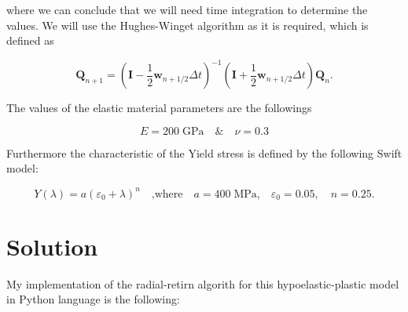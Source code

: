 \documentclass[12pt,a4paper]{article}
\begin{document}
where we can conclude that we will need time integration to determine the values. We will use the Hughes-Winget algorithm as it is required, which is defined as 

\begin{equation}
    \boldsymbol{Q}_{n+1} = \left(\boldsymbol{I} - \frac{1}{2} \boldsymbol{w}_{n+1/2} \Delta t \right)^{-1} 
\left(\boldsymbol{I} + \frac{1}{2} \boldsymbol{w}_{n+1/2} \Delta t \right) 
\boldsymbol{Q}_n.
\end{equation}

The values of the elastic material parameters are the followings

\begin{equation}
    E = 200 \;\text{GPa} \quad\&\quad \nu = 0.3
\end{equation}

Furthermore the characteristic of the Yield stress is defined by the following Swift model:

\begin{equation}
    Y(\lambda) = a(\varepsilon_0+\lambda)^n\quad \text{,where} \quad a=400\;\text{MPa,} \quad \varepsilon_0=0.05, \quad n=0.25.
\end{equation}

\newpage

\section*{Solution}

My implementation of the radial-retirn algorith for this hypoelastic-plastic model in Python language is the following:
\end{document}
